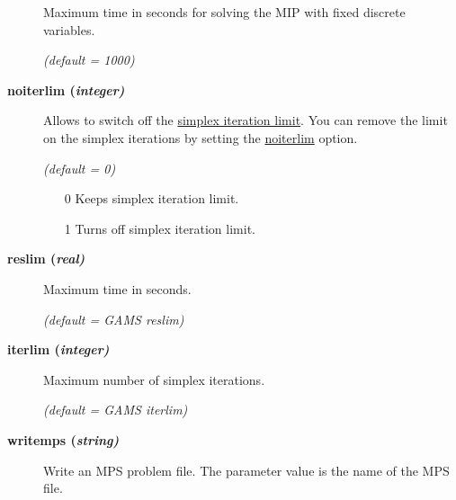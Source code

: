 \begin{description}
Maximum time in seconds for solving the MIP with fixed discrete variables.

\textsl{(default = 1000)}

\item[\label{noiterlim}\hypertarget{noiterlim}
{\textbf{noiterlim (\slshape{integer})}}]\hspace{1.0in}

Allows to switch off the \hyperlink{iterlim}{simplex iteration limit}.
You can remove the limit on the simplex iterations by setting the \hyperlink{noiterlim}{noiterlim} option.

\textsl{(default = 0)}
\begin{itemize}
\item[0] 
Keeps simplex iteration limit.
\item[1] 
Turns off simplex iteration limit.
\end{itemize}

\item[\label{glpkreslim}\hypertarget{glpkreslim}
{\textbf{reslim (\slshape{real})}}]\hspace{1.0in}

Maximum time in seconds.

\textsl{(default = GAMS reslim)}

\item[\label{glpkiterlim}\hypertarget{glpkiterlim}
{\textbf{iterlim (\slshape{integer})}}]\hspace{1.0in}

Maximum number of simplex iterations.

\textsl{(default = GAMS iterlim)}

\item[\label{glpkwritemps}\hypertarget{glpkwritemps}
{\textbf{writemps (\slshape{string})}}]\hspace{1.0in}

Write an MPS problem file.
The parameter value is the name of the MPS file.

\end{description}
